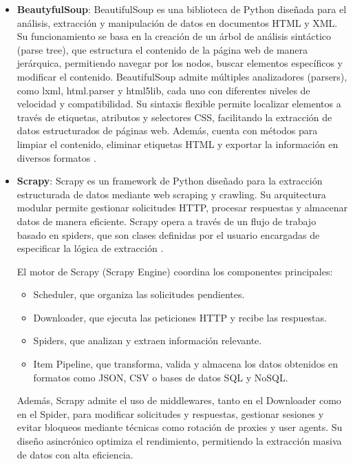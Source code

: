 \begin{itemize}
    \item \textbf{BeautyfulSoup}: BeautifulSoup es una biblioteca de Python diseñada para el análisis, extracción y manipulación de datos en documentos HTML y XML. 
    Su funcionamiento se basa en la creación de un árbol de análisis sintáctico (parse tree), que estructura el contenido de la página web de manera jerárquica, permitiendo navegar por los nodos, buscar elementos específicos y modificar el contenido.
    BeautifulSoup admite múltiples analizadores (parsers), como lxml, html.parser y html5lib, cada uno con diferentes niveles de velocidad y compatibilidad. 
    Su sintaxis flexible permite localizar elementos a través de etiquetas, atributos y selectores CSS, facilitando la extracción de datos estructurados de páginas web. Además, cuenta con métodos para limpiar el contenido, eliminar etiquetas HTML y exportar la información en diversos formatos \cite{9274270}.

    \item \textbf{Scrapy}: Scrapy es un framework de Python diseñado para la extracción estructurada de datos mediante web scraping y crawling. 
    Su arquitectura modular permite gestionar solicitudes HTTP, procesar respuestas y almacenar datos de manera eficiente. 
    Scrapy opera a través de un flujo de trabajo basado en spiders, que son clases definidas por el usuario encargadas de especificar la lógica de extracción \cite{domparsing}.
    
    El motor de Scrapy (Scrapy Engine) coordina los componentes principales:
    
    \begin{itemize}
        \item Scheduler, que organiza las solicitudes pendientes.
        \item Downloader, que ejecuta las peticiones HTTP y recibe las respuestas.
        \item Spiders, que analizan y extraen información relevante.
        \item Item Pipeline, que transforma, valida y almacena los datos obtenidos en formatos como JSON, CSV o bases de datos SQL y NoSQL.
    \end{itemize}

    Además, Scrapy admite el uso de middlewares, tanto en el Downloader como en el Spider, para modificar solicitudes y respuestas, gestionar sesiones y evitar bloqueos mediante técnicas como rotación de proxies y user agents. 
    Su diseño asincrónico optimiza el rendimiento, permitiendo la extracción masiva de datos con alta eficiencia.


\end{itemize}

